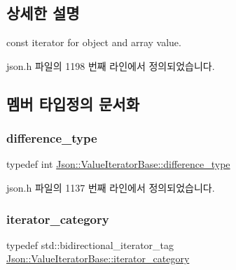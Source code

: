 \subsection{상세한 설명}
const iterator for object and array value. 



json.\+h 파일의 1198 번째 라인에서 정의되었습니다.



\subsection{멤버 타입정의 문서화}
\mbox{\label{class_json_1_1_value_iterator_base_a4e44bf8cbd17ec8d6e2c185904a15ebd}} 
\subsubsection{\texorpdfstring{difference\+\_\+type}{difference\_type}}
{\footnotesize\ttfamily typedef int \hyperlink{class_json_1_1_value_iterator_base_a4e44bf8cbd17ec8d6e2c185904a15ebd}{Json\+::\+Value\+Iterator\+Base\+::difference\+\_\+type}\hspace{0.3cm}{\ttfamily [inherited]}}



json.\+h 파일의 1137 번째 라인에서 정의되었습니다.

\mbox{\label{class_json_1_1_value_iterator_base_a02fd11a4fbdc0007da1e8bcf5e6b83c3}} 
\subsubsection{\texorpdfstring{iterator\+\_\+category}{iterator\_category}}
{\footnotesize\ttfamily typedef std\+::bidirectional\+\_\+iterator\+\_\+tag \hyperlink{class_json_1_1_value_iterator_base_a02fd11a4fbdc0007da1e8bcf5e6b83c3}{Json\+::\+Value\+Iterator\+Base\+::iterator\+\_\+category}\hspace{0.3cm}{\ttfamily [inherited]}}



